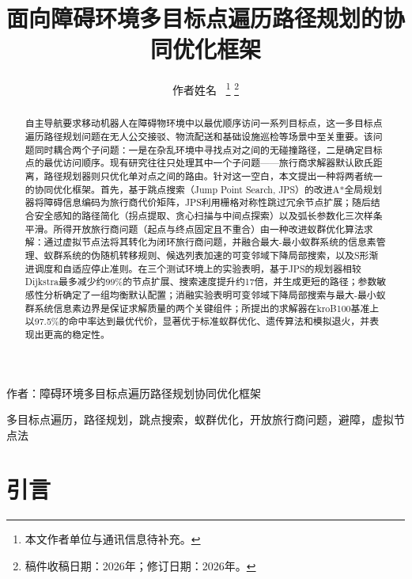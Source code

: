\documentclass[lettersize,journal]{IEEEtran}
\begin{document}
\title{面向障碍环境多目标点遍历路径规划的协同优化框架}

\author{作者姓名~%
\thanks{本文作者单位与通讯信息待补充。}%
\thanks{稿件收稿日期：2026年；修订日期：2026年。}}

%
{作者：障碍环境多目标点遍历路径规划协同优化框架}

\maketitle

\begin{abstract}

自主导航要求移动机器人在障碍物环境中以最优顺序访问一系列目标点，这一多目标点遍历路径规划问题在无人公交接驳、物流配送和基础设施巡检等场景中至关重要。该问题同时耦合两个子问题：一是在杂乱环境中寻找点对之间的无碰撞路径，二是确定目标点的最优访问顺序。现有研究往往只处理其中一个子问题——旅行商求解器默认欧氏距离，路径规划器则只优化单对点之间的路由。针对这一空白，本文提出一种将两者统一的协同优化框架。首先，基于跳点搜索（Jump Point Search, JPS）的改进A*全局规划器将障碍信息编码为旅行商代价矩阵，JPS利用栅格对称性跳过冗余节点扩展；随后结合安全感知的路径简化（拐点提取、贪心扫描与中间点探索）以及弧长参数化三次样条平滑。所得开放旅行商问题（起点与终点固定且不重合）由一种改进蚁群优化算法求解：通过虚拟节点法将其转化为闭环旅行商问题，并融合最大-最小蚁群系统的信息素管理、蚁群系统的伪随机转移规则、候选列表加速的可变邻域下降局部搜索，以及S形渐进调度和自适应停止准则。在三个测试环境上的实验表明，基于JPS的规划器相较Dijkstra最多减少约99\%的节点扩展、搜索速度提升约17倍，并生成更短的路径；参数敏感性分析确定了一组均衡默认配置；消融实验表明可变邻域下降局部搜索与最大-最小蚁群系统信息素边界是保证求解质量的两个关键组件；所提出的求解器在kroB100基准上以97.5\%的命中率达到最优代价，显著优于标准蚁群优化、遗传算法和模拟退火，并表现出更高的稳定性。

\end{abstract}

\begin{IEEEkeywords}

多目标点遍历，路径规划，跳点搜索，蚁群优化，开放旅行商问题，避障，虚拟节点法

\end{IEEEkeywords}

\section{引言}
\end{document}
